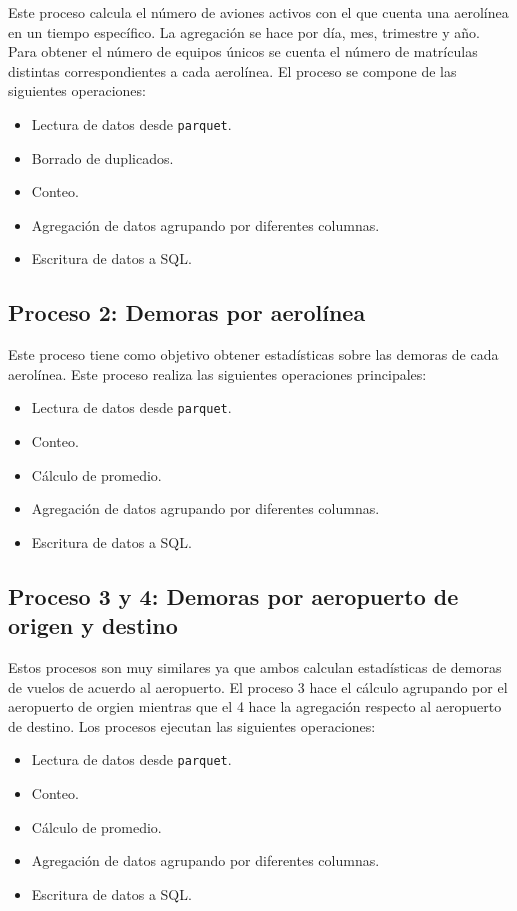 Este proceso calcula el número de aviones activos con el que cuenta una aerolínea en un tiempo específico. La agregación se hace por día, mes, trimestre y año. Para obtener el número de equipos únicos se cuenta el número de matrículas distintas correspondientes a cada aerolínea. El proceso se compone de las siguientes operaciones:

\begin{itemize}
	\item Lectura de datos desde \texttt{parquet}.
	\item Borrado de duplicados.
	\item Conteo.
	\item Agregación de datos agrupando por diferentes columnas.
	\item Escritura de datos a SQL.
\end{itemize}

\subsection{Proceso 2: Demoras por aerolínea}

Este proceso tiene como objetivo obtener estadísticas sobre las demoras de cada aerolínea. Este proceso realiza las siguientes operaciones principales:

\begin{itemize}
	\item Lectura de datos desde \texttt{parquet}.
	\item Conteo.
	\item Cálculo de promedio.
	\item Agregación de datos agrupando por diferentes columnas.
	\item Escritura de datos a SQL.
\end{itemize}

\subsection{Proceso 3 y 4: Demoras por aeropuerto de origen y destino}

Estos procesos son muy similares ya que ambos calculan estadísticas de demoras de vuelos de acuerdo al aeropuerto. El proceso 3 hace el cálculo agrupando por el aeropuerto de orgien mientras que el 4 hace la agregación respecto al aeropuerto de destino. Los procesos ejecutan las siguientes operaciones:

\begin{itemize}
	\item Lectura de datos desde \texttt{parquet}.
	\item Conteo.
	\item Cálculo de promedio.
	\item Agregación de datos agrupando por diferentes columnas.
	\item Escritura de datos a SQL.
\end{itemize}


